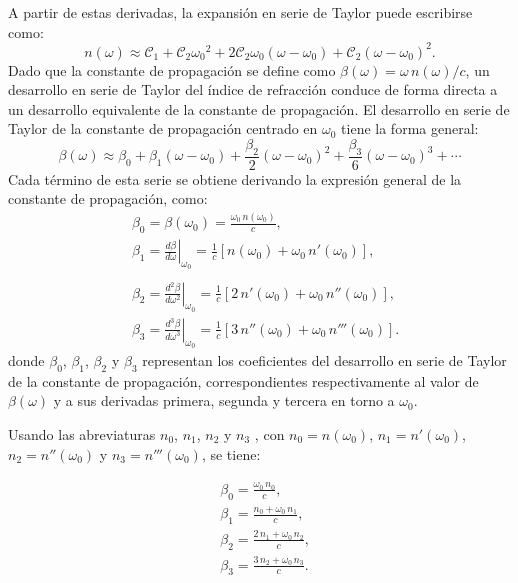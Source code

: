 A partir de estas derivadas, la expansión en serie de Taylor puede escribirse como:
\begin{equation}
n(\omega) \approx \mathcal{C}_1 + \mathcal{C}_2 {\omega_0}^2 
+ 2\mathcal{C}_2 \omega_0 (\omega - \omega_0) 
+ \mathcal{C}_2 (\omega - \omega_0)^2.
\end{equation}
Dado que la constante de propagación se define como $\beta(\omega) = \omega\,n(\omega)/c$, un desarrollo en serie de Taylor del índice de refracción conduce de forma directa a un desarrollo equivalente de la constante de propagación. El desarrollo en serie de Taylor de la constante de propagación centrado en $\omega_0$ tiene la forma general:
\begin{equation}
\beta(\omega) \approx \beta_0 + \beta_1 (\omega - \omega_0) + \frac{\beta_2}{2} (\omega - \omega_0)^2 + \frac{\beta_3}{6} (\omega - \omega_0)^3 + \dotsb
\end{equation}
Cada término de esta serie se obtiene derivando la expresión general de la constante de propagación, como:
\begin{equation}
\begin{split}
&\beta_0 = \beta(\omega_0) = \frac{\omega_0\,n(\omega_0)}{c},\\
&\beta_1 = \left. \frac{d\beta}{d\omega} \right|_{\omega_0}
         = \frac{1}{c}\left[ n(\omega_0) + \omega_0\,n'(\omega_0) \right], \\ \\
&\beta_2 = \left. \frac{d^2 \beta}{d\omega^2} \right|_{\omega_0}
         = \frac{1}{c}\left[ 2\,n'(\omega_0) + \omega_0\,n''(\omega_0) \right],\\
&\beta_3 = \left. \frac{d^3 \beta}{d\omega^3} \right|_{\omega_0}
         = \frac{1}{c}\left[ 3\,n''(\omega_0) + \omega_0\,n'''(\omega_0) \right].
\label{eq:beta3}
\end{split}
\end{equation}
donde $\beta_0$, $\beta_1$, $\beta_2$ y $\beta_3$ representan los coeficientes del desarrollo en serie de Taylor de la constante de propagación, correspondientes respectivamente al valor de $\beta(\omega)$ y a sus derivadas primera, segunda y tercera en torno a $\omega_0$.

Usando las abreviaturas $n_0$, $n_1$, $n_2$ y $n_3$ , con $n_0 = n(\omega_0)$, $n_1 = n'(\omega_0)$, $n_2 = n''(\omega_0)$ y $n_3 = n'''(\omega_0)$, se tiene:

\begin{equation}
\begin{split}
&\beta_0 = \frac{\omega_0\,n_0}{c},\\
&\beta_1 = \frac{n_0 + \omega_0\,n_1}{c},\\ 
&\beta_2 = \frac{2\,n_1 + \omega_0\,n_2}{c},\\
&\beta_3 = \frac{3\,n_2 + \omega_0\,n_3}{c}.
\end{split}
\end{equation}

